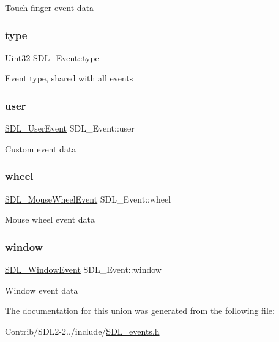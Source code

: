 Touch finger event data \mbox{\label{union_s_d_l___event_a237648bec242d2d5835f1a4250ddfa46}} 
\subsubsection{\texorpdfstring{type}{type}}
{\footnotesize\ttfamily \mbox{\hyperlink{_s_d_l__stdinc_8h_add440eff171ea5f55cb00c4a9ab8672d}{Uint32}} S\+D\+L\+\_\+\+Event\+::type}

Event type, shared with all events \mbox{\label{union_s_d_l___event_ab7c394e3ce7bf1e4f8d68bc0e9f1b042}} 
\subsubsection{\texorpdfstring{user}{user}}
{\footnotesize\ttfamily \mbox{\hyperlink{struct_s_d_l___user_event}{S\+D\+L\+\_\+\+User\+Event}} S\+D\+L\+\_\+\+Event\+::user}

Custom event data \mbox{\label{union_s_d_l___event_a267d3f550715519ec90a81ccd0e6cbda}} 
\subsubsection{\texorpdfstring{wheel}{wheel}}
{\footnotesize\ttfamily \mbox{\hyperlink{struct_s_d_l___mouse_wheel_event}{S\+D\+L\+\_\+\+Mouse\+Wheel\+Event}} S\+D\+L\+\_\+\+Event\+::wheel}

Mouse wheel event data \mbox{\label{union_s_d_l___event_a826936b3275406d857bc6654669fae71}} 
\subsubsection{\texorpdfstring{window}{window}}
{\footnotesize\ttfamily \mbox{\hyperlink{struct_s_d_l___window_event}{S\+D\+L\+\_\+\+Window\+Event}} S\+D\+L\+\_\+\+Event\+::window}

Window event data 

The documentation for this union was generated from the following file\+:\begin{DoxyCompactItemize}
\item 
Contrib/\+S\+D\+L2-\/2../include/\mbox{\hyperlink{_s_d_l__events_8h}{S\+D\+L\+\_\+events.\+h}}\end{DoxyCompactItemize}
